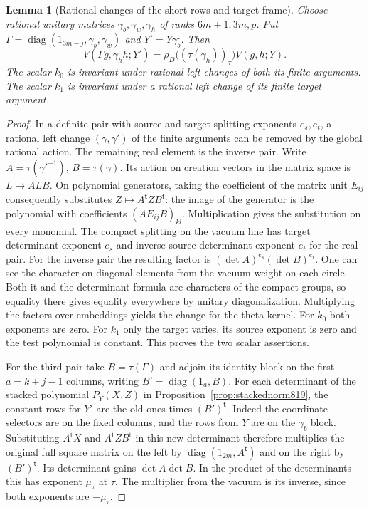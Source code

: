 \documentclass[a4paper,11pt]{article}
\newtheorem{lemma}[proposition]{Lemma}
\theoremstyle{definition}
\theoremstyle{remark}
\numberwithin{equation}{section}
\begin{document}
\begin{lemma}[Rational changes of the short rows and target frame]
\leavevmode\label{lem:frameequiv822}
Choose rational unitary matrices \(\gamma_b,\gamma_w,\gamma_h\)
of ranks \(6m+1,3m,p\). Put
\(\Gamma=\operatorname{diag}(1_{3m-j},\gamma_b,\gamma_w)\) and
\(Y'=Y\gamma_b^{\mathsf t}\). Then
\[
  V(\Gamma g,\gamma_h h;Y')
      =\rho_D\big((\tau(\gamma_h))_\tau\big)V(g,h;Y).
\]
The scalar \(k_0\) is invariant under rational left changes of
both its finite arguments. The scalar \(k_1\) is invariant
under a rational left change of its finite target argument.
\end{lemma}
\begin{proof}
In a definite pair with source and target splitting exponents
\(e_s,e_t\), a rational left change \((\gamma,\gamma')\)
of the finite arguments can be removed by the global rational
action. The remaining real element is the inverse pair. Write
\(A=\tau(\gamma'^{-1})\), \(B=\tau(\gamma)\). Its action on
creation vectors in the matrix space is \(L\mapsto A L B\).
On polynomial generators, taking the coefficient of the
matrix unit \(E_{ij}\) consequently substitutes
\(Z\mapsto A^{\mathsf t}Z B^{\mathsf t}\): the image of the
generator is the polynomial with coefficients \((AE_{ij}B)_{kl}\).
Multiplication gives the substitution on every monomial.
The compact splitting on the vacuum line has target determinant
exponent \(e_s\) and inverse source determinant exponent \(e_t\)
for the real pair. For the inverse pair the resulting factor is
\((\det A)^{e_s}(\det B)^{e_t}\).
One can see the character on diagonal elements from the
vacuum weight on each circle. Both it and the determinant
formula are characters of the compact groups, so equality
there gives equality everywhere by unitary diagonalization.
Multiplying the factors over embeddings yields the change
for the theta kernel. For \(k_0\) both exponents are zero.
For \(k_1\) only the target varies, its source exponent is
zero and the test polynomial is constant. This proves the
two scalar assertions.

For the third pair take \(B=\tau(\Gamma)\) and adjoin its
identity block on the first \(a=k+j-1\) columns, writing
\(B'=\operatorname{diag}(1_a,B)\).
For each determinant of the stacked polynomial \(P_Y(X,Z)\)
in Proposition~\ref{prop:stackednorm819}, the constant rows
for \(Y'\) are the old ones times \((B')^{\mathsf t}\).
Indeed the coordinate selectors are on the fixed columns,
and the rows from \(Y\) are on the \(\gamma_b\) block.
Substituting \(A^{\mathsf t}X\) and
\(A^{\mathsf t}Z B^{\mathsf t}\) in this new determinant
therefore multiplies the original full square matrix on the
left by \(\operatorname{diag}(1_{2m},A^{\mathsf t})\)
and on the right by \((B')^{\mathsf t}\).
Its determinant gains \(\det A\det B\). In the product of
the determinants this has exponent \(\mu_\tau\) at \(\tau\).
The multiplier from the vacuum is its inverse, since both
exponents are \(-\mu_\tau\).


\end{proof}
\end{document}
